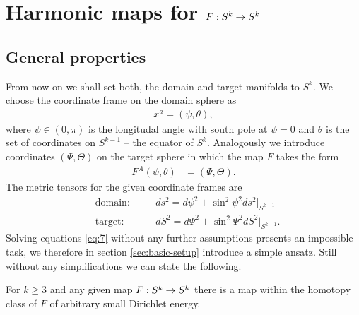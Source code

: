 \section{Harmonic maps for $F:S^k\rightarrow S^k$}
\label{sec:harmonic-maps-skra}

\subsection{General properties}
\label{sec:general-properties}

From now on we shall set both, the domain and target manifolds to
$S^k$. We choose the coordinate frame on the domain sphere as
\begin{align}
  \label{eq:8}
  x^a=(\psi,\theta),
\end{align}
where $\psi\in(0,\pi)$ is the longitudal angle with
south pole at $\psi=0$ and $\theta$ is the set of coordinates on
$S^{k-1}$ -- the equator of $S^k$. Analogously we introduce
coordinates $(\Psi,\Theta)$ on the target sphere in which the map $F$
takes the form
\begin{align}
  \label{eq:9}
  F^A(\psi,\theta)&=(\Psi,\Theta).
\end{align}
The metric tensors for the given coordinate frames are
\begin{align}
  \label{eq:10}
  &\text{domain:}&\quad &ds^2=d\psi^2+\sin^2\psi^2ds^2\big|_{S^{k-1}}\\
  &\text{target:}&\quad &dS^2=d\Psi^2+\sin^2\Psi^2dS^2\big|_{S^{k-1}}.
\end{align}
Solving equations \eqref{eq:7} without any further assumptions
presents an impossible task, we therefore in section
\ref{sec:basic-setup} introduce a simple ansatz. Still without any
simplifications we can state the following.

\begin{theorem}\label{thm:skk-energy-bound}
  For $k\ge3$ and any given map $F:S^k\rightarrow S^k$ there is a map within
  the homotopy class of $F$ of arbitrary small Dirichlet energy.
\end{theorem}

